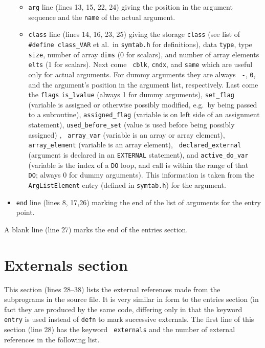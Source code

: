 \documentclass{article}
\begin{document}
\begin{itemize}
  \begin{itemize}

    \item {\tt arg} line (lines 13, 15, 22, 24) giving the position in
    the argument sequence and the {\tt name} of the actual argument.

    \item {\tt class} line (lines 14, 16, 23, 25) giving the storage
        {\tt class} (see list of {\tt \#define class\_VAR} et al.\ in
        {\tt symtab.h} for definitions), data {\tt type}, type {\tt
        size}, number of array {\tt dims} (0 for scalars), and number
        of array elements {\tt elts} (1 for scalars).  Next come {\tt
        cblk}, {\tt cndx}, and {\tt same} which are useful only for
        actual arguments.  For dummy arguments they are always {\tt
        -}, {\tt 0}, and the argument's position in the argument list,
        respectively.  Last come the {\tt flags} {\tt is\_lvalue}
        (always 1 for dummy arguments), {\tt set\_flag} (variable is
        assigned or otherwise possibly modified, e.g.\ by being passed
        to a subroutine), {\tt assigned\_flag} (variable is on left
        side of an assignment statement), {\tt used\_before\_set}
        (value is used before being possibly assigned) , {\tt
        array\_var} (variable is an array or array element), {\tt
        array\_element} (variable is an array element), {\tt
        declared\_external} (argument is declared in an {\tt EXTERNAL}
        statement), and {\tt active\_do\_var} (variable is the index
        of a {\tt DO} loop, and call is within the range of that {\tt
        DO}; always 0 for dummy arguments).  This
        information is taken from the {\tt
        ArgListElement} entry (defined in {\tt symtab.h}) for the
        argument.

  \end{itemize}

  \item {\tt end} line (lines 8, 17,26) marking the end of the list of
	arguments for the entry point.

\end{itemize}

A blank line (line 27) marks the end of the entries section.

\section{Externals section}
This section (lines 28--38) lists the external references made from
the subprograms in the source file.  It is very similar in form to the
entries section (in fact they are produced by the same code, differing
only in that the keyword {\tt entry} is used instead of {\tt defn} to mark
successive externals.
The first line of this section (line 28) has the keyword {\tt
externals} and the number of external references in the following
list.
\end{document}
